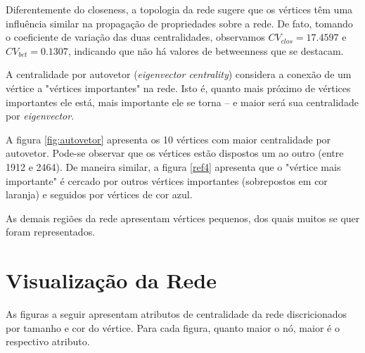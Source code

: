 \documentclass{article}
\begin{document}
Diferentemente do closeness, a topologia da rede sugere que os vértices têm uma influência similar na propagação de propriedades sobre a rede. 
De fato, tomando o coeficiente de variação das duas centralidades, observamos $CV_{clos} = 17.4597$ e $CV_{bet} = 0.1307$, indicando que não há valores de betweenness que se destacam. 

A centralidade por autovetor (\textit{eigenvector centrality}) considera a conexão de um vértice a "vértices importantes" na rede. 
Isto é, quanto mais próximo de vértices importantes ele está, mais importante ele se torna -- e maior será sua centralidade por \textit{eigenvector}.

A figura \ref{fig:autovetor} apresenta os 10 vértices com maior centralidade por autovetor. 
Pode-se observar que os vértices estão dispostos um ao outro (entre 1912 e 2464). 
De maneira similar, a figura \ref{ref4} apresenta que o "vértice mais importante" é cercado por outros vértices importantes (sobrepostos em cor laranja) e seguidos por vértices de cor azul. 

As demais regiões da rede apresentam vértices pequenos, dos quais muitos se quer foram representados. 




\newpage
\section{Visualização da Rede}
As figuras a seguir apresentam atributos de centralidade da rede discricionados por tamanho e cor do vértice. 
Para cada figura, quanto maior o nó, maior é o respectivo atributo. 
\end{document}
